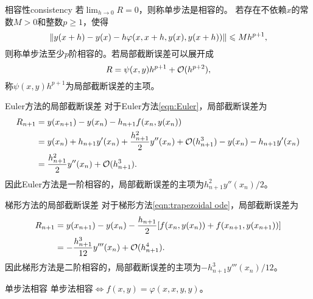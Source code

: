 \begin{definition}
    {相容性}{consistency}
    若$\lim_{h\to0}R=0$，则称单步法是相容的。
    \tcblower
    若存在不依赖$x$的常数$M>0$和整数$p\geq 1$，使得
    \begin{equation}
        \left\lVert y(x+h)-y(x)-h\varphi(x,x+h,y(x),y(x+h))\right\rVert\leqslant Mh^{p+1},
    \end{equation}
    则称单步法至少$p$阶相容的。若局部截断误差可以展开成
    \[
        R=\psi(x,y)h^{p+1}+\mathcal O(h^{p+2}),
    \]
    称$\psi(x,y)h^{p+1}$为局部截断误差的主项。
\end{definition}

\begin{example}
    {Euler方法的局部截断误差}{}
    对于Euler方法\eqref{eqn:Euler}，局部截断误差为
    \begin{align*}
        R_{n+1}&=y(x_{n+1})-y(x_n)-h_{n+1}f(x_n,y(x_n))\\
        &=y(x_n)+h_{n+1}y'(x_n)+\frac{h_{n+1}^2}2y''(x_n)+\mathcal O(h_{n+1}^3)-y(x_n)-h_{n+1}y'(x_n)\\
        &=\frac{h_{n+1}^2}2y''(x_n)+\mathcal O(h_{n+1}^3).
    \end{align*}
    因此Euler方法是一阶相容的，局部截断误差的主项为$h_{n+1}^2y''(x_n)/2$。
\end{example}

\begin{example}
    {梯形方法的局部截断误差}{}
    对于梯形方法\eqref{eqn:trapezoidal ode}，局部截断误差为
    \begin{align*}
        R_{n+1}&=y(x_{n+1})-y(x_n)-\frac{h_{n+1}}2[f(x_n,y(x_n))+f(x_{n+1},y(x_{n+1}))]\\
        &=-\frac{h_{n+1}^3}{12}y'''(x_n)+\mathcal O(h_{n+1}^4).
    \end{align*}
    因此梯形方法是二阶相容的，局部截断误差的主项为$-h_{n+1}^3y'''(x_n)/12$。
\end{example}

\begin{theorem}
    {单步法相容}{}
    单步法相容$\iff f(x,y)=\varphi(x,x,y,y)$。
\end{theorem}

